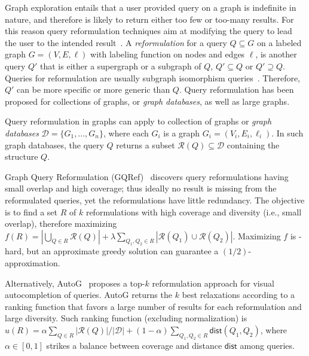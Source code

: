 



\noindent Graph exploration entails that a user provided query on a graph is indefinite in nature, and therefore is likely to return either too few or too-many results. 
For this reason query reformulation techniques aim at modifying the query to lead the user to the intended result~\citep{mottin2015graph,hurtado2008query,islam2015efficient}. 
A \emph{reformulation} for a query $Q \subseteq G$ on a labeled graph $G = (V, E, \ell)$ with labeling function on nodes and edges $\ell$, is another query $Q'$ that is either a supergraph or a subgraph of $Q$, $Q' \subseteq Q$ or $Q' \supseteq Q$. 
Queries for reformulation are usually subgraph isomorphism queries~\cite{lee2012depth}.  
Therefore, $Q'$ can be more specific or more generic than $Q$. 
Query reformulation has been proposed for collections of graphs, or \emph{graph databases}, as well as large graphs. 

Query reformulation in graphs can apply to collection of graphs or \emph{graph databases} $\mathcal{D} = \{G_1, ..., G_n\}$, where each $G_i$ is a graph $G_i = (V_i, E_i, \ell_i)$. 
In such graph databases, the query $Q$ returns a subset $\mathcal{R}(Q) \subseteq \mathcal{D}$ containing the structure $Q$. 

Graph Query Reformulation (GQRef)~\citep{mottin2015graph} discovers query reformulations having small overlap and high coverage; thus ideally no result is missing from the reformulated queries, yet the reformulations have little redundancy. 
The objective is to find a set $R$ of $k$ reformulations with high coverage and diversity (i.e., small overlap), therefore maximizing $f(R) = |\bigcup_{Q \in R}\mathcal{R}(Q)|+ \lambda\sum_{Q_1,Q_2 \in R}|\mathcal{R}(Q_1) \cup \mathcal{R}(Q_2)|$. 
Maximizing $f$ is \NP-hard, but an approximate greedy solution can guarantee a $(1/2)$-approximation. 

Alternatively, AutoG~\citep{yi2017autog} proposes a top-$k$ reformulation approach for visual autocompletion of queries. 
AutoG returns the $k$ best relaxations according to a ranking function that favors a large number of results for each reformulation and large diversity. 
Such ranking function (excluding normalization) is $u(R) = \alpha \sum_{Q \in R}|\mathcal{R}(Q)|/|\mathcal{D}| + (1-\alpha) \sum_{Q_1, Q_2 \in R} \mathsf{dist}(Q_1, Q_2)$, where  $\alpha \in [0,1]$ strikes a balance between coverage and distance $\mathsf{dist}$ among queries.



